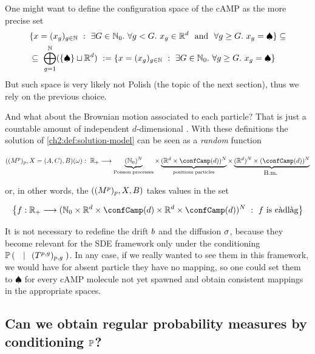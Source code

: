 \begin{remark}
	One might want to define the configuration space of the cAMP as the more precise set
	\begin{align*}
		&\{
		x = (x_g)_{g\in\mathbb{N}}\
		:\
		\exists G\in\mathbb{N}_0.\
		\forall g < G.\
		x_g \in \mathbb{R}^d\
		\text{ and }\
		\forall g\geq G.\
		x_g =\spadesuit
		\}\subseteq
		\\
		&\subseteq\
		\bigoplus_{g=1}^{\mathbb{N}} (\{\spadesuit\} \sqcup \mathbb{R}^d)\
		:=
		\{
		x = (x_g)_{g\in\mathbb{N}}\
		:\
		\exists G\in\mathbb{N}_0.\
		\forall g\geq G.\
		x_g =\spadesuit
		\}
	\end{align*}
	But such space is very likely not Polish (the topic of the next section), thus we rely on the previous choice.
\end{remark}

And what about the Brownian motion associated to each particle? That is just a countable amount of independent $d$-dimensional \Bm.
With these definitions the solution of \ref{ch2:def:solution-model} can be seen as a \emph{random \cadlag} function 

\begin{equation*}
	((\hmactive^p)_p, \sol = (\amba, \camp), B) (\omega):\
	\R_+ \longrightarrow 
	\underbrace{
		(\N_0)^N
	}_{\text{Poisson processes}}
	\times
	\underbrace{
		(\R^d\times\confCamp(d))^N 
	}_{ \text{positions particles}}
		\times 
	\underbrace{
		(\R^d)^N \times (\confCamp(d))^N
	}_{\Bm}
\end{equation*}

or, in other words, the \rv $((M^p)_p, X, B)$ takes values in the set

\begin{equation}\label{app:def:space-of-solutions}
	\left\{
		f:\R_+ \longrightarrow 
			(\N_0
			\times
			\R^d\times\confCamp(d)
			\times 
			\R^d \times \confCamp(d))^N\
			:\
			f \text{ is \cadlag}
	\right\}
\end{equation}

It is not necessary to redefine the drift $b$ and the diffusion $\sigma$, because they become relevant for the SDE framework only under the conditioning $\mathbb{P} \left( \; \left. \;  \; \right| \; \;(T^{p,g})_{p,g}  \; \right)$. In any case, if we really wanted to see them in this framework, we would have for absent particle they have no mapping, so one could set them to  $\spadesuit$ for every cAMP molecule not yet spawned and obtain consistent mappings in the appropriate spaces.

\subsection{Can we obtain regular probability measures by conditioning $\mathbb{P}$?}

